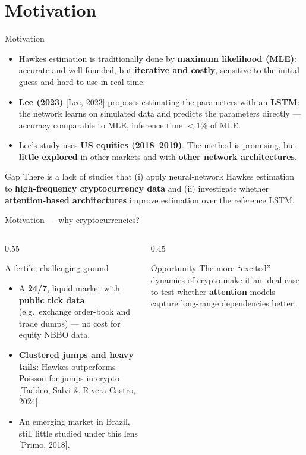 \documentclass[aspectratio=169]{beamer}
\newcommand{\cit}[1]{{\footnotesize\color{mcmPrimary}[#1]}}
\begin{document}
\section{Motivation}
\begin{frame}{Motivation}
  \begin{itemize}
    \item Hawkes estimation is traditionally done by \textbf{maximum likelihood (MLE)}: accurate and well-founded, but \textbf{iterative and costly}, sensitive to the initial guess and hard to use in real time.
    \item \textbf{Lee (2023)} \cit{Lee, 2023} proposes estimating the parameters with an \textbf{LSTM}: the network learns on simulated data and predicts the parameters directly — accuracy comparable to MLE, inference time $<1\%$ of MLE.
    \item Lee's study uses \textbf{US equities (2018--2019)}. The method is promising, but \textbf{little explored} in other markets and with \textbf{other network architectures}.
  \end{itemize}
  \begin{alertblock}{Gap}
    There is a lack of studies that (i) apply neural-network Hawkes estimation to \textbf{high-frequency cryptocurrency data} and (ii) investigate whether \textbf{attention-based architectures} improve estimation over the reference LSTM.
  \end{alertblock}
\end{frame}

\begin{frame}{Motivation — why cryptocurrencies?}
  \begin{columns}[T]
    \begin{column}{0.55\textwidth}
      \begin{block}{A fertile, challenging ground}
        \begin{itemize}
          \item A \textbf{24/7}, liquid market with \textbf{public tick data} (e.g.\ exchange order-book and trade dumps) — no cost for equity NBBO data.
          \item \textbf{Clustered jumps and heavy tails}: Hawkes outperforms Poisson for jumps in crypto \cit{Taddeo, Salvi \& Rivera-Castro, 2024}.
          \item An emerging market in Brazil, still little studied under this lens \cit{Primo, 2018}.
        \end{itemize}
      \end{block}
    \end{column}
    \begin{column}{0.45\textwidth}
      \begin{alertblock}{Opportunity}
        The more ``excited'' dynamics of crypto make it an ideal case to test whether \textbf{attention} models capture long-range dependencies better.
      \end{alertblock}
    \end{column}
  \end{columns}
\end{frame}
\end{document}
